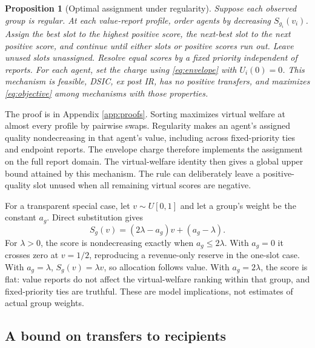 \documentclass[11pt]{article}
\newtheorem{proposition}{Proposition}
\begin{document}
\begin{proposition}[Optimal assignment under regularity]\label{prop:optimal}
Suppose each observed group is regular. At each value-report profile, order agents by decreasing $S_{g_i}(v_i)$. Assign the best slot to the highest positive score, the next-best slot to the next positive score, and continue until either slots or positive scores run out. Leave unused slots unassigned. Resolve equal scores by a fixed priority independent of reports. For each agent, set the charge using \eqref{eq:envelope} with $U_i(0)=0$. This mechanism is feasible, DSIC, ex post IR, has no positive transfers, and maximizes \eqref{eq:objective} among mechanisms with those properties.
\end{proposition}

The proof is in Appendix \ref{app:proofs}. Sorting maximizes virtual welfare at almost every profile by pairwise swaps. Regularity makes an agent's assigned quality nondecreasing in that agent's value, including across fixed-priority ties and endpoint reports. The envelope charge therefore implements the assignment on the full report domain. The virtual-welfare identity then gives a global upper bound attained by this mechanism. The rule can deliberately leave a positive-quality slot unused when all remaining virtual scores are negative.

For a transparent special case, let $v\sim U[0,1]$ and let a group's weight be the constant $a_g$. Direct substitution gives
\begin{equation}\label{eq:linear}
S_g(v)=(2\lambda-a_g)v+(a_g-\lambda).
\end{equation}
For $\lambda>0$, the score is nondecreasing exactly when $a_g\le2\lambda$. With $a_g=0$ it crosses zero at $v=1/2$, reproducing a revenue-only reserve in the one-slot case. With $a_g=\lambda$, $S_g(v)=\lambda v$, so allocation follows value. With $a_g=2\lambda$, the score is flat: value reports do not affect the virtual-welfare ranking within that group, and fixed-priority ties are truthful. These are model implications, not estimates of actual group weights.

\subsection*{A bound on transfers to recipients}
\end{document}
